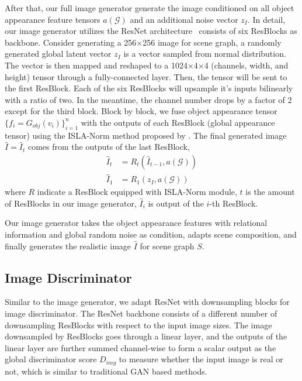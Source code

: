 After that, our full image generator generate the image conditioned on all object appearance feature tensors $a(\mathcal{G})$ and an additional noise vector $z_{I}$. In detail, our image generator utilizes the ResNet architecture~\cite{he2016deep} consists of six ResBlocks as backbone. Consider generating a 256$\times$256 image for scene graph, a randomly generated global latent vector $z_{I}$ is a vector sampled from normal distribution. The vector is then mapped and reshaped to a 1024$\times$4$\times$4 (channels, width, and height) tensor through a fully-connected layer. Then, the tensor will be sent to the first ResBlock. Each of the six ResBlocks will upsample it's inputs bilinearly with a ratio of two. In the meantime, the channel number drops by a factor of 2 except for the third block. Block by block, we fuse object appearance tensor $\{f_{i} = G_{obj}(v_i)\}_{i=1}^n$ with the outputs of each ResBlock (global appearance tensor) using the ISLA-Norm method proposed by \cite{sun2019image}. The final generated image $\widehat{I} = \widehat{I}_t$ comes from the outputs of the last ResBlock, 
\begin{equation}
\begin{split}
    \widehat{I}_t &= R_t(\widehat{I}_{t-1},a(\mathcal{G})) \\
    \widehat{I}_1 &= R_1(z_I,a(\mathcal{G}))
\end{split}    
\end{equation}
where $R$ indicate a ResBlock equipped with ISLA-Norm module, $t$ is the amount of ResBlocks in our image generator, $\widehat{I}_i$ is output of the $i$-th ResBlock. 

Our image generator takes the object appearance features with relational information and global random noise as condition, adapts scene composition, and finally generates the realistic image $\widehat{I}$ for scene graph $S$.

\subsection{Image Discriminator}

Similar to the image generator, we adapt ResNet with downsampling blocks for image discriminator. The ResNet backbone consists of a different number of downsampling ResBlocks with respect to the input image sizes. %
The image downsampled by ResBlocks goes through a linear layer, and the outputs of the linear layer are further summed channel-wise to form a scalar output as the global discriminator score $D_{img}$ to measure whether the input image is real or not, which is similar to traditional GAN based methods.

